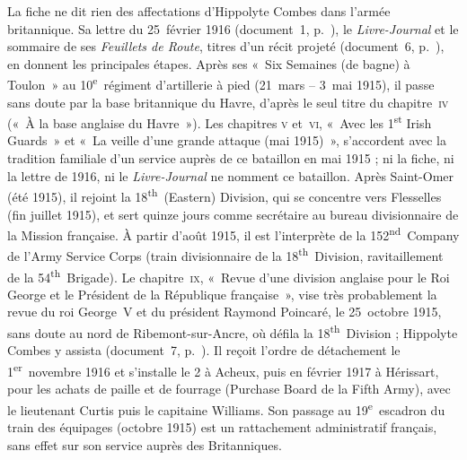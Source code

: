 La fiche ne dit rien des affectations d'Hippolyte Combes dans l'armée britannique. Sa lettre du 25~février 1916 (document~1, p.~\pageref{annexe:doc1}), le \textit{Livre-Journal} et le sommaire de ses \textit{Feuillets de Route}, titres d'un récit projeté (document~6, p.~\pageref{annexe:doc6-sommaire}), en donnent les principales étapes. Après ses «~Six Semaines (de bagne) à Toulon~» au 10\textsuperscript{e}~régiment d'artillerie à pied (21~mars -- 3~mai 1915), il passe sans doute par la base britannique du Havre, d'après le seul titre du chapitre~\textsc{iv} («~À la base anglaise du Havre~»). Les chapitres \textsc{v} et~\textsc{vi}, «~Avec les 1\textsuperscript{st} Irish Guards~» et «~La veille d'une grande attaque (mai 1915)~», s'accordent avec la tradition familiale d'un service auprès de ce bataillon en mai 1915 ; ni la fiche, ni la lettre de 1916, ni le \textit{Livre-Journal} ne nomment ce bataillon. Après Saint-Omer (été 1915), il rejoint la 18\textsuperscript{th}~(Eastern) Division, qui se concentre vers Flesselles (fin juillet 1915), et sert quinze jours comme secrétaire au bureau divisionnaire de la Mission française. À partir d'août 1915, il est l'interprète de la 152\textsuperscript{nd}~Company de l'Army Service Corps (train divisionnaire de la 18\textsuperscript{th}~Division, ravitaillement de la 54\textsuperscript{th}~Brigade). Le chapitre~\textsc{ix}, «~Revue d'une division anglaise pour le Roi George et le Président de la République française~», vise très probablement la revue du roi George~V et du président Raymond Poincaré, le 25~octobre 1915, sans doute au nord de Ribemont-sur-Ancre, où défila la 18\textsuperscript{th}~Division ; Hippolyte Combes y assista (document~7, p.~\pageref{annexe:doc7}). Il reçoit l'ordre de détachement le 1\textsuperscript{er}~novembre 1916 et s'installe le 2 à Acheux, puis en février 1917 à Hérissart, pour les achats de paille et de fourrage (Purchase Board de la Fifth Army), avec le lieutenant Curtis puis le capitaine Williams. Son passage au 19\textsuperscript{e}~escadron du train des équipages (octobre 1915) est un rattachement administratif français, sans effet sur son service auprès des Britanniques.
